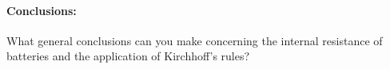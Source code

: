 \paragraph {Conclusions:}  What general conclusions can you make concerning the internal resistance of batteries and the application of Kirchhoff's rules?

